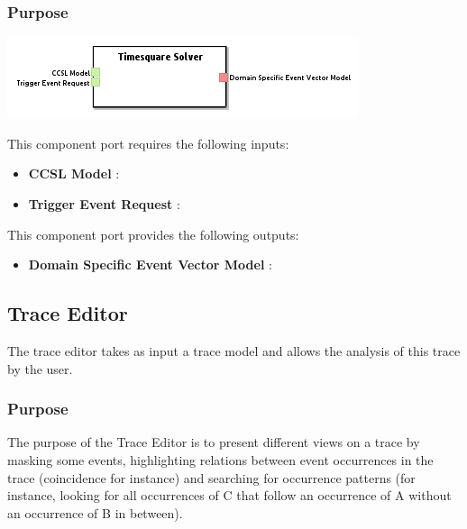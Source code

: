 \documentclass{gemoc} %
\begin{document}

\subsubsection{Purpose}


\begin{center}
\includegraphics*[trim=0.0cm 0.0cm 0cm 0.0cm, clip=true]{../images/generated/Generated_Timesquare_Solver.png}
\end{center}

This component port requires the following inputs:
\begin{itemize}
  \item \textbf{CCSL Model} :
  \item \textbf{Trigger Event Request} :
\end{itemize}

This component port provides the following outputs:
\begin{itemize}
  \item \textbf{Domain Specific Event Vector Model} :
\end{itemize}


\subsection{Trace Editor}
The trace editor takes as input a trace model and allows the analysis of this trace by the user.

\subsubsection{Purpose}
The purpose of the Trace Editor is to present different views on a trace by masking some events, highlighting relations between event occurrences in the trace (coincidence for instance) and searching for occurrence patterns (for instance, looking for all occurrences of C that follow an occurrence of A without an occurrence of B in between).
 
\end{document}
